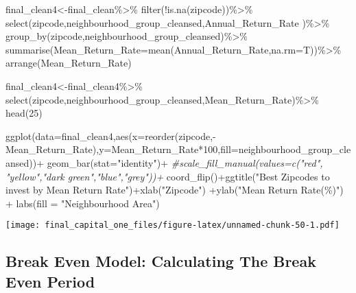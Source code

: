 \documentclass[
]{article}
\newenvironment{Shaded}{\begin{snugshade}}{\end{snugshade}}
\newcommand{\AttributeTok}[1]{\textcolor[rgb]{0.77,0.63,0.00}{#1}}
\newcommand{\CommentTok}[1]{\textcolor[rgb]{0.56,0.35,0.01}{\textit{#1}}}
\newcommand{\DecValTok}[1]{\textcolor[rgb]{0.00,0.00,0.81}{#1}}
\newcommand{\FunctionTok}[1]{\textcolor[rgb]{0.00,0.00,0.00}{#1}}
\newcommand{\NormalTok}[1]{#1}
\newcommand{\OtherTok}[1]{\textcolor[rgb]{0.56,0.35,0.01}{#1}}
\newcommand{\SpecialCharTok}[1]{\textcolor[rgb]{0.00,0.00,0.00}{#1}}
\newcommand{\StringTok}[1]{\textcolor[rgb]{0.31,0.60,0.02}{#1}}
\begin{document}
\begin{Shaded}
\begin{Highlighting}[]
\NormalTok{final\_clean4}\OtherTok{\textless{}{-}}\NormalTok{final\_clean}\SpecialCharTok{\%\textgreater{}\%}
  \FunctionTok{filter}\NormalTok{(}\SpecialCharTok{!}\FunctionTok{is.na}\NormalTok{(zipcode))}\SpecialCharTok{\%\textgreater{}\%}
  \FunctionTok{select}\NormalTok{(zipcode,neighbourhood\_group\_cleansed,Annual\_Return\_Rate )}\SpecialCharTok{\%\textgreater{}\%}
  \FunctionTok{group\_by}\NormalTok{(zipcode,neighbourhood\_group\_cleansed)}\SpecialCharTok{\%\textgreater{}\%}
  \FunctionTok{summarise}\NormalTok{(}\AttributeTok{Mean\_Return\_Rate=}\FunctionTok{mean}\NormalTok{(Annual\_Return\_Rate,}\AttributeTok{na.rm=}\NormalTok{T))}\SpecialCharTok{\%\textgreater{}\%}
  \FunctionTok{arrange}\NormalTok{(Mean\_Return\_Rate)}

\NormalTok{final\_clean4}\OtherTok{\textless{}{-}}\NormalTok{final\_clean4}\SpecialCharTok{\%\textgreater{}\%}
  \FunctionTok{select}\NormalTok{(zipcode,neighbourhood\_group\_cleansed,Mean\_Return\_Rate)}\SpecialCharTok{\%\textgreater{}\%}
  \FunctionTok{head}\NormalTok{(}\DecValTok{25}\NormalTok{)}

\FunctionTok{ggplot}\NormalTok{(}\AttributeTok{data=}\NormalTok{final\_clean4,}\FunctionTok{aes}\NormalTok{(}\AttributeTok{x=}\FunctionTok{reorder}\NormalTok{(zipcode,}\SpecialCharTok{{-}}\NormalTok{Mean\_Return\_Rate),}\AttributeTok{y=}\NormalTok{Mean\_Return\_Rate}\SpecialCharTok{*}\DecValTok{100}\NormalTok{,}\AttributeTok{fill=}\NormalTok{neighbourhood\_group\_cleansed))}\SpecialCharTok{+}
  \FunctionTok{geom\_bar}\NormalTok{(}\AttributeTok{stat=}\StringTok{"identity"}\NormalTok{)}\SpecialCharTok{+} 
  \CommentTok{\#scale\_fill\_manual(values=c("red", "yellow","dark green","blue","grey"))+}
  \FunctionTok{coord\_flip}\NormalTok{()}\SpecialCharTok{+}\FunctionTok{ggtitle}\NormalTok{(}\StringTok{"Best Zipcodes to invest by Mean Return Rate"}\NormalTok{)}\SpecialCharTok{+}\FunctionTok{xlab}\NormalTok{(}\StringTok{"Zipcode"}\NormalTok{) }\SpecialCharTok{+}\FunctionTok{ylab}\NormalTok{(}\StringTok{"Mean Return Rate(\%)"}\NormalTok{) }\SpecialCharTok{+} \FunctionTok{labs}\NormalTok{(}\AttributeTok{fill =} \StringTok{"Neighbourhood Area"}\NormalTok{)}
\end{Highlighting}
\end{Shaded}

\texttt{[image: final\_capital\_one\_files/figure-latex/unnamed-chunk-50-1.pdf]}

\hypertarget{break-even-model-calculating-the-break-even-period}{%
\subsection{Break Even Model: Calculating The Break Even
Period}\label{break-even-model-calculating-the-break-even-period}}
\end{document}
